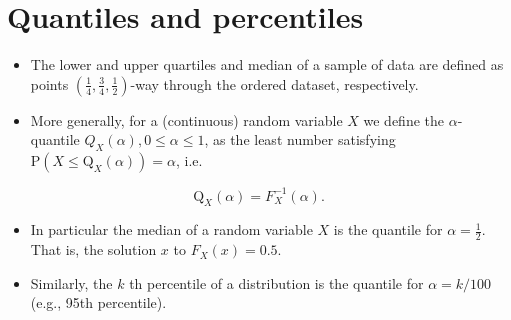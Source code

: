 \documentclass[10pt]{article}
\begin{document}




\section*{Quantiles and percentiles}
\begin{itemize}
  \item The lower and upper quartiles and median of a sample of data are defined as points $\left(\frac{1}{4}, \frac{3}{4}, \frac{1}{2}\right)$-way through the ordered dataset, respectively.
  \item More generally, for a (continuous) random variable $X$ we define the $\alpha$-quantile $Q_{X}(\alpha), 0 \leq \alpha \leq 1$, as the least number satisfying $\mathrm{P}\left(X \leq \mathrm{Q}_{X}(\alpha)\right)=\alpha$, i.e.
\end{itemize}

$$
\mathrm{Q}_{X}(\alpha)=F_{X}^{-1}(\alpha) .
$$

\begin{itemize}
  \item In particular the median of a random variable $X$ is the quantile for $\alpha=\frac{1}{2}$. That is, the solution $x$ to $F_{X}(x)=0.5$.
  \item Similarly, the $k$ th percentile of a distribution is the quantile for $\alpha=k / 100$ (e.g., 95th percentile).
\end{itemize}
\end{document}
